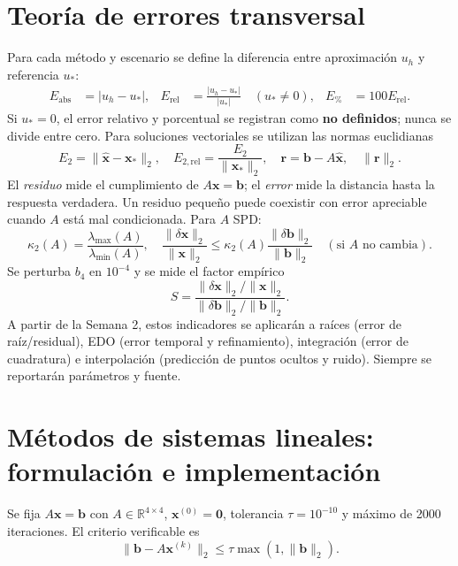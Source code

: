 \documentclass[letterpaper,11pt]{article}
\begin{document}
\section{Teoría de errores transversal}
Para cada método y escenario se define la diferencia entre aproximación $u_h$ y referencia $u_*$:
\begin{align}
 E_{\mathrm{abs}} &= |u_h-u_*|,&
 E_{\mathrm{rel}} &= \frac{|u_h-u_*|}{|u_*|}\quad (u_*\ne 0),&
 E_{\%} &= 100 E_{\mathrm{rel}}.\label{eq:errores}
\end{align}
Si $u_*=0$, el error relativo y porcentual se registran como \textbf{no definidos}; nunca se divide entre cero. Para soluciones vectoriales se utilizan las normas euclidianas
\begin{equation}\label{eq:error-vector}
E_2=\|\widehat{\boldsymbol{x}}-\boldsymbol{x}_*\|_2,\quad
E_{2,\mathrm{rel}}=\frac{E_2}{\|\boldsymbol{x}_*\|_2},\quad
\boldsymbol{r}=\boldsymbol{b}-A\widehat{\boldsymbol{x}},\quad \|\boldsymbol{r}\|_2.
\end{equation}
El \emph{residuo} mide el cumplimiento de $A\boldsymbol{x}=\boldsymbol{b}$; el \emph{error} mide la distancia hasta la respuesta verdadera. Un residuo pequeño puede coexistir con error apreciable cuando $A$ está mal condicionada. Para $A$ SPD:
\begin{equation}\label{eq:condicion}
\kappa_2(A)=\frac{\lambda_{\max}(A)}{\lambda_{\min}(A)},\quad
\frac{\|\delta\boldsymbol{x}\|_2}{\|\boldsymbol{x}\|_2}\le\kappa_2(A)
\frac{\|\delta\boldsymbol{b}\|_2}{\|\boldsymbol{b}\|_2}
\quad (\text{si }A\text{ no cambia}).
\end{equation}
Se perturba $b_4$ en $10^{-4}$ y se mide el factor empírico
\begin{equation}\label{eq:sensibilidad}
S=\frac{\|\delta\boldsymbol{x}\|_2/\|\boldsymbol{x}\|_2}{\|\delta\boldsymbol{b}\|_2/\|\boldsymbol{b}\|_2}.
\end{equation}
A partir de la Semana 2, estos indicadores se aplicarán a raíces (error de raíz/residual), EDO (error temporal y refinamiento), integración (error de cuadratura) e interpolación (predicción de puntos ocultos y ruido). Siempre se reportarán parámetros y fuente.

\section{Métodos de sistemas lineales: formulación e implementación}
Se fija $A\boldsymbol{x}=\boldsymbol{b}$ con $A\in\mathbb{R}^{4\times4}$, $\boldsymbol{x}^{(0)}=\boldsymbol{0}$, tolerancia $\tau=10^{-10}$ y máximo de \num{2000} iteraciones. El criterio verificable es
\begin{equation}\label{eq:parada}
\|\boldsymbol{b}-A\boldsymbol{x}^{(k)}\|_2\le\tau\max(1,\|\boldsymbol{b}\|_2).
\end{equation}
\end{document}
